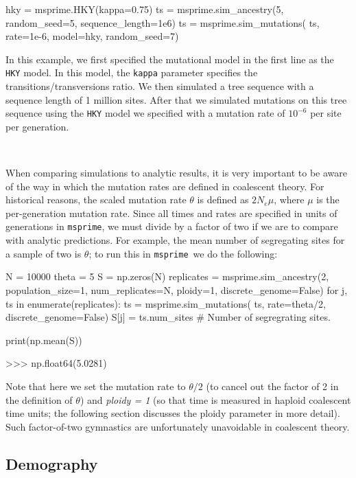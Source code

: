 \documentclass[graybox]{svmult}
\newcommand{\msprime}[0]{\texttt{msprime}}
\begin{document}
\begin{pythoncode}
hky = msprime.HKY(kappa=0.75)
ts = msprime.sim_ancestry(5, random_seed=5, sequence_length=1e6)
ts = msprime.sim_mutations(
    ts, rate=1e-6, model=hky, random_seed=7)
\end{pythoncode}

In this example, we first specified the mutational model in the first line as the \texttt{HKY} model. In this model, the \texttt{kappa} parameter specifies
the transitions/transversions ratio. We then simulated a tree sequence with a sequence length of 1 million sites. After that we simulated mutations on this tree
sequence using the \texttt{HKY} model we specified with a mutation rate of \(10^{-6}\) per site per generation.

 \

When comparing simulations to analytic results, it is very important to be aware of the way in which the
mutation rates are defined in coalescent theory. For historical reasons,
the scaled mutation rate \(\theta\) is defined as \(2N_e \mu\), where
\(\mu\) is the per-generation mutation rate. Since all times and rates
are specified in units of generations in \msprime, we must divide by a
factor of two if we are to compare with analytic predictions. For
example, the mean number of segregating sites for a sample of two is
\(\theta\); to run this in \msprime\ we do the following:

\begin{pythoncode}
N = 10000
theta = 5
S = np.zeros(N)
replicates = msprime.sim_ancestry(2, population_size=1,
    num_replicates=N, ploidy=1, discrete_genome=False)
for j, ts in enumerate(replicates):
    ts = msprime.sim_mutations(
        ts, rate=theta/2, discrete_genome=False)
    S[j] = ts.num_sites  # Number of segregrating sites.

print(np.mean(S))

>>> np.float64(5.0281)

\end{pythoncode}

    Note that here we set the mutation rate to \(\theta / 2\) (to cancel out
the factor of 2 in the definition of \(\theta\)) and \emph{ploidy = 1} (so
that time is measured in haploid coalescent time units; the following section discusses the ploidy parameter in more detail). Such
factor-of-two gymnastics are unfortunately unavoidable in coalescent
theory.

\subsection{Demography}\label{Demography}
\end{document}
